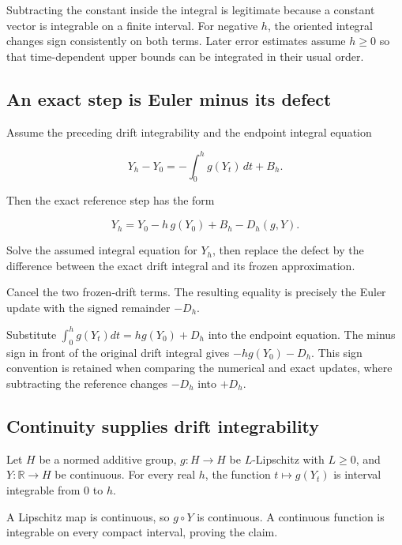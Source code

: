 \documentclass[11pt,a4paper]{report}
\begin{document}
Subtracting the constant inside the integral is legitimate because a constant vector is integrable on a finite interval. For negative \(h\), the oriented integral changes sign consistently on both terms. Later error estimates assume \(h\ge0\) so that time-dependent upper bounds can be integrated in their usual order.

\subsection{\texorpdfstring{An exact step is Euler minus its defect}{An exact step is Euler minus its defect}}
\label{report-step-UnadjustedLangevin-LocalError-lean-3}


Assume the preceding drift integrability and the endpoint integral equation

\[Y_h-Y_0=-\int_0^h g(Y_t)\,dt+B_h.\]

Then the exact reference step has the form

\[Y_h=Y_0-h\,g(Y_0)+B_h-D_h(g,Y).\]

Solve the assumed integral equation for \(Y_h\), then replace the defect by the difference between the exact drift integral and its frozen approximation.



Cancel the two frozen-drift terms. The resulting equality is precisely the Euler update with the signed remainder \(-D_h\).



Substitute \(\int_0^hg(Y_t)dt=hg(Y_0)+D_h\) into the endpoint equation. The minus sign in front of the original drift integral gives \(-hg(Y_0)-D_h\). This sign convention is retained when comparing the numerical and exact updates, where subtracting the reference changes \(-D_h\) into \(+D_h\).

\subsection{\texorpdfstring{Continuity supplies drift integrability}{Continuity supplies drift integrability}}
\label{report-step-UnadjustedLangevin-LocalError-lean-4}


Let \(H\) be a normed additive group, \(g:H\to H\) be \(L\)-Lipschitz with \(L\ge0\), and \(Y:\mathbb R\to H\) be continuous. For every real \(h\), the function \(t\mapsto g(Y_t)\) is interval integrable from \(0\) to \(h\).



A Lipschitz map is continuous, so \(g\circ Y\) is continuous. A continuous function is integrable on every compact interval, proving the claim.
\end{document}
